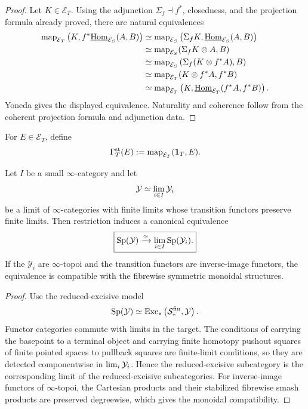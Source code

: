 \begin{proof}
Let \(K\in\mathcal E_T\).  Using the adjunction \(\Sigma_f\dashv f^*\), closedness, and the projection
formula already proved, there are natural equivalences
\[
\begin{aligned}
    \operatorname{map}_{\mathcal E_T}
    \left(
        K,f^*\underline{\operatorname{Hom}}_{\mathcal E_S}(A,B)
    \right)
    &\simeq
    \operatorname{map}_{\mathcal E_S}
    \left(
        \Sigma_f K,\underline{\operatorname{Hom}}_{\mathcal E_S}(A,B)
    \right)
    \\
    &\simeq
    \operatorname{map}_{\mathcal E_S}(\Sigma_f K\otimes A,B)
    \\
    &\simeq
    \operatorname{map}_{\mathcal E_S}
    \left(
        \Sigma_f(K\otimes f^*A),B
    \right)
    \\
    &\simeq
    \operatorname{map}_{\mathcal E_T}(K\otimes f^*A,f^*B)
    \\
    &\simeq
    \operatorname{map}_{\mathcal E_T}
    \left(
        K,\underline{\operatorname{Hom}}_{\mathcal E_T}(f^*A,f^*B)
    \right).
\end{aligned}
\]
Yoneda gives the displayed equivalence.  Naturality and coherence follow from the coherent
projection formula and adjunction data.
\end{proof}

\begin{definition}
\label{def:monadic-de-rham-stable-sections}
For \(E\in\mathcal E_T\), define
\[
    \Gamma_T^{\mathrm{st}}(E)
    :=
    \operatorname{map}_{\mathcal E_T}(\mathbf 1_T,E).
\]
\end{definition}

\begin{lemma}
\label{lem:monadic-de-rham-stabilization-limits}
Let \(I\) be a small \(\infty\)-category and let
\[
    \mathcal Y\simeq\operatorname*{lim}_{i\in I}\mathcal Y_i
\]
be a limit of \(\infty\)-categories with finite limits whose transition functors preserve finite
limits.  Then restriction induces a canonical equivalence
\[
\boxed{
    \mathrm{Sp}(\mathcal Y)
    \xrightarrow{\simeq}
    \operatorname*{lim}_{i\in I}\mathrm{Sp}(\mathcal Y_i).
}
\]
If the \(\mathcal Y_i\) are \(\infty\)-topoi and the transition functors are inverse-image
functors, the equivalence is compatible with the fibrewise symmetric monoidal structures.
\end{lemma}

\begin{proof}
Use the reduced-excisive model
\[
    \mathrm{Sp}(\mathcal Y)
    \simeq
    \operatorname{Exc}_*
    \left(
        \mathcal S_*^{\mathrm{fin}},\mathcal Y
    \right).
\]
Functor categories commute with limits in the target.  The conditions of carrying the basepoint to
a terminal object and carrying finite homotopy pushout squares of finite pointed spaces to pullback
squares are finite-limit conditions, so they are detected componentwise in
\(\operatorname*{lim}_i\mathcal Y_i\).  Hence the reduced-excisive subcategory is the corresponding limit of the
reduced-excisive subcategories.  For inverse-image functors of \(\infty\)-topoi, the Cartesian
products and their stabilized fibrewise smash products are preserved degreewise, which gives the
monoidal compatibility.
\end{proof}

